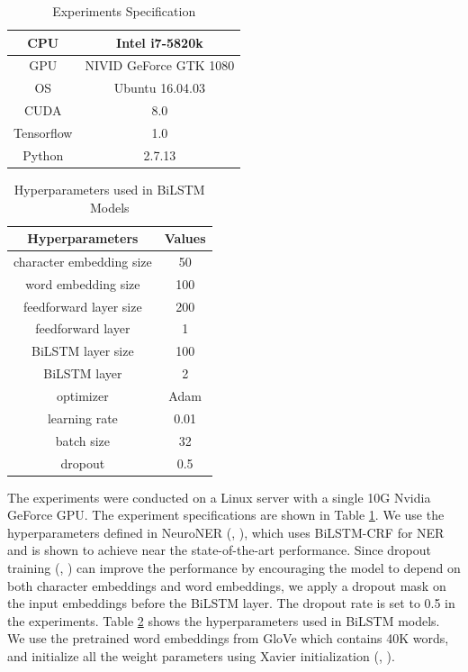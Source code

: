 \begin{table}[h]
\centering
\caption{Experiments Specification}
\label{table:hardware}
\begin{tabular}{|c|c|}
\hline
CPU & Intel i7-5820k \\ \hline
GPU & NIVID GeForce GTK 1080 \\ \hline
OS & Ubuntu 16.04.03 \\ \hline
CUDA & 8.0 \\ \hline
Tensorflow & 1.0 \\ \hline
Python & 2.7.13 \\ \hline
\end{tabular}
\end{table}

\begin{table}[h]
\centering
\caption{Hyperparameters used in BiLSTM Models}
\label{table:hyperparameters2}
\begin{tabular}{|c|c|}
\hline
Hyperparameters & Values \\ \hline
character embedding size & 50 \\ \hline
word embedding size & 100 \\ \hline
feedforward layer size & 200 \\ \hline
feedforward layer & 1 \\ \hline
BiLSTM layer size & 100 \\ \hline
BiLSTM layer & 2 \\ \hline 
optimizer & Adam \\ \hline
learning rate & 0.01 \\ \hline
batch size & 32 \\ \hline
dropout & 0.5 \\ \hline
\end{tabular}
\end{table}

The experiments were conducted on a Linux server with a single 10G Nvidia GeForce GPU. The experiment specifications are shown in Table \ref{table:hardware}. We use the hyperparameters defined in NeuroNER  (\citeauthor{2017neuroner}, \citeyear{2017neuroner}), which uses BiLSTM-CRF for NER and is shown to achieve near the state-of-the-art performance. Since dropout training (\citeauthor{hinton2012improving}, \citeyear{hinton2012improving}) can improve the performance by encouraging the model to depend on both character embeddings and word embeddings, we apply a dropout mask on the input embeddings before the BiLSTM layer. The dropout rate is set to 0.5 in the experiments. Table \ref{table:hyperparameters2} shows the hyperparameters used in BiLSTM models. We use the pretrained word embeddings from GloVe which contains 40K words, and initialize all the weight parameters using Xavier initialization (\citeauthor{glorot2011domain}, \citeyear{glorot2011domain}).

